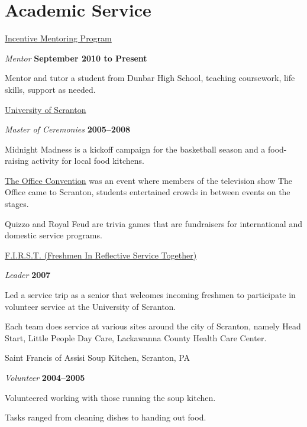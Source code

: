 \documentclass[11pt,a4paper]{moderncv}
\begin{document}
\section{ Academic Service}
\href{http://incentivementoringprogram.org/}{Incentive Mentoring Program} 
\begin{outerlist}
\item[] \textit{Mentor}%
        \hfill \textbf{September 2010 to Present}
\begin{innerlist}
\item Mentor and tutor a student from Dunbar High School, teaching coursework, life skills, support as needed.
\end{innerlist}
\end{outerlist}



\href{www.scranton.edu}{University of Scranton}
\begin{outerlist}
\item[] \textit{Master of Ceremonies}
  \hfill \textbf{2005--2008}
\item Midnight Madness is a kickoff campaign for the basketball season and a food-raising activity for local food kitchens.  \item \href{http://www.theofficeconvention.com/}{The Office Convention} was an event where members of the television show The Office came to Scranton, students  entertained crowds in between events on the stages.  
\item Quizzo and Royal Feud are trivia games that are fundraisers for international and domestic service programs. 
\end{outerlist}



\href{http://academic.scranton.edu/organization/edjustice/events.shtml}{F.I.R.S.T. (Freshmen In Reflective Service Together)}
\begin{outerlist}
\item[] \textit{Leader} 
 \hfill \textbf{2007}
\item Led a service trip as a senior that welcomes incoming freshmen to participate in volunteer service at the University of Scranton.
\item Each team does service at various sites around the city of Scranton, namely Head Start, Little People Day Care, Lackawanna County Health Care Center.
\end{outerlist}



Saint Francis of Assisi Soup Kitchen, Scranton, PA
\begin{outerlist}
\item[] \textit{Volunteer}
\hfill \textbf{2004--2005}
\item Volunteered working with those running the soup kitchen.
\item Tasks ranged from cleaning dishes to handing out food.
\end{outerlist}
\end{document}
